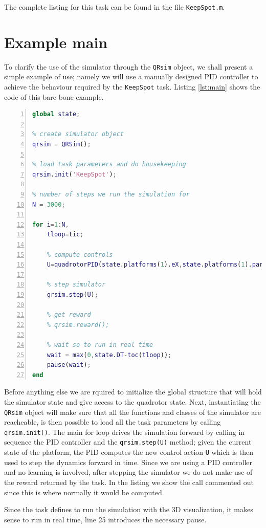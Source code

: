 \documentclass[a4paper,11pt]{report}
\newcommand{\sname}{QRsim\xspace}
\begin{document}
The complete listing for this task can be found in the file \texttt{KeepSpot.m}.  

\section{Example main}
To clarify the use of the simulator through the \texttt{\sname} object, we shall present a simple example of use; namely we will use a manually designed PID controller to achieve the behaviour required by the \texttt{KeepSpot} task.
Listing \ref{lst:main} shows the code of this bare bone example. 
\begin{lstlisting}[float=ht!bp,caption=main script,language=Matlab,frame=lines,label=lst:main,numbers=left,basicstyle=\small]
global state;

% create simulator object
qrsim = QRSim();

% load task parameters and do housekeeping
qrsim.init('KeepSpot');

% number of steps we run the simulation for
N = 3000;

for i=1:N,
    tloop=tic;    

    % compute controls
    U=quadrotorPID(state.platforms(1).eX,state.platforms(1).params.X(1:3));
    
    % step simulator 
    qrsim.step(U);

    % get reward
    % qrsim.reward();

    % wait so to run in real time
    wait = max(0,state.DT-toc(tloop));   
    pause(wait);    
end
\end{lstlisting}
Before anything else we are rquired to initialize the global structure that will hold the simulator state and give access to the quadrotor state. Next, instantiating the \texttt{\sname} object will make sure that all the functions and classes of the simulator are reacheable, is then possible to load all the task parameters by calling \texttt{qrsim.init()}. 
The main for loop drives the simulation forward by calling in sequence the PID controller and the \texttt{qrsim.step(U)} method; given the current state of the platform, the PID computes the new control action  \texttt{U} which is then used to step the dynamics forward in time.
Since we are using a PID controller and no learning is involved, after stepping the simulator we do not make use of the reward returned by the task. In the listing we show the call commented out since this is where normally it would be computed.

Since the task defines to run the simulation with the 3D visualization, it makes sense to run in real time, line 25 introduces the necessary pause.  
\end{document}
